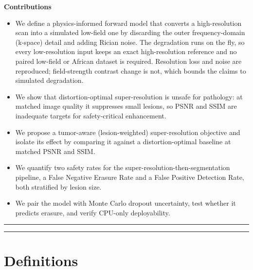 \documentclass[11pt,a4paper]{article}
\newcommand{\headfont}{\sffamily}
\newcommand{\thinrule}{\noindent\textcolor{rule}{\rule{\linewidth}{0.6pt}}}
\begin{document}
\vspace{0.3em}
{\headfont\normalsize\bfseries\color{ink} Contributions}
\begin{itemize}
  \item We define a physics-informed forward model that converts a high-resolution scan into a simulated low-field one by discarding the outer frequency-domain (k-space) detail and adding Rician noise. The degradation runs on the fly, so every low-resolution input keeps an exact high-resolution reference and no paired low-field or African dataset is required. Resolution loss and noise are reproduced; field-strength contrast change is not, which bounds the claims to simulated degradation.
  \item We show that distortion-optimal super-resolution is unsafe for pathology: at matched image quality it suppresses small lesions, so PSNR and SSIM are inadequate targets for safety-critical enhancement.
  \item We propose a tumor-aware (lesion-weighted) super-resolution objective and isolate its effect by comparing it against a distortion-optimal baseline at matched PSNR and SSIM.
  \item We quantify two safety rates for the super-resolution-then-segmentation pipeline, a False Negative Erasure Rate and a False Positive Detection Rate, both stratified by lesion size.
  \item We pair the model with Monte Carlo dropout uncertainty, test whether it predicts erasure, and verify CPU-only deployability.
\end{itemize}

\thinrule

\thinrule

\section*{Definitions}
\end{document}
